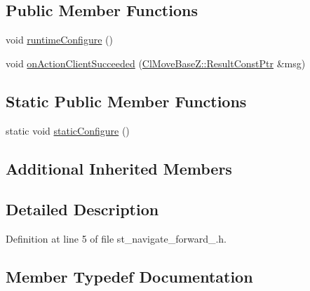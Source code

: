 \subsection*{Public Member Functions}
\begin{DoxyCompactItemize}
\item 
void \hyperlink{structsm__dance__bot__2_1_1StNavigateForward1_a2e6dc2fa60d7ef43ba41a1455bba358f}{runtime\+Configure} ()
\item 
void \hyperlink{structsm__dance__bot__2_1_1StNavigateForward1_a6ca4d488672e844032a5ddd3a14d5942}{on\+Action\+Client\+Succeeded} (\hyperlink{classcl__move__base__z_1_1ClMoveBaseZ_a99373d0c15ae96684462d8677f5fd632}{Cl\+Move\+Base\+Z\+::\+Result\+Const\+Ptr} \&msg)
\end{DoxyCompactItemize}
\subsection*{Static Public Member Functions}
\begin{DoxyCompactItemize}
\item 
static void \hyperlink{structsm__dance__bot__2_1_1StNavigateForward1_a8eb2bd5bf92d72f03dac52161995cb8f}{static\+Configure} ()
\end{DoxyCompactItemize}
\subsection*{Additional Inherited Members}


\subsection{Detailed Description}


Definition at line 5 of file st\+\_\+navigate\+\_\+forward\+\_.\+h.



\subsection{Member Typedef Documentation}
\mbox{\label{structsm__dance__bot__2_1_1StNavigateForward1_ad3a42f210e6afa69c006cf9c06329297}} 
